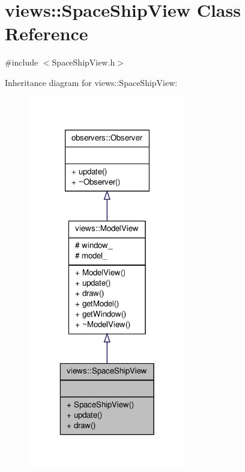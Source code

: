 \hypertarget{classviews_1_1SpaceShipView}{\section{views\-:\-:\-Space\-Ship\-View \-Class \-Reference}
\label{d7/d5c/classviews_1_1SpaceShipView}
}


{\ttfamily \#include $<$\-Space\-Ship\-View.\-h$>$}



\-Inheritance diagram for views\-:\-:\-Space\-Ship\-View\-:
\nopagebreak
\begin{figure}[H]
\begin{center}
\leavevmode
\includegraphics[width=196pt]{d9/d4d/classviews_1_1SpaceShipView__inherit__graph}
\end{center}
\end{figure}


